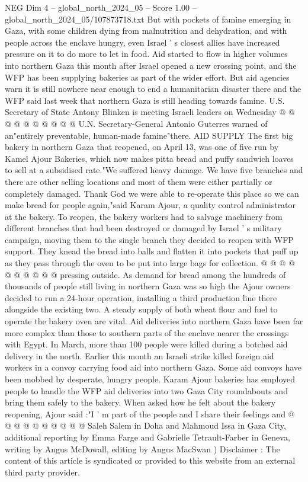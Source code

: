 \begin{textsample}{NEG Dim 4 – global\_north\_2024\_05 – Score 1.00 – global\_north\_2024\_05/107873718.txt}
But with pockets of famine emerging in Gaza, with some children dying from malnutrition and dehydration, and with people across the enclave hungry, even Israel ' s closest allies have increased pressure on it to do more to let in food.
Aid started to flow in higher volumes into northern Gaza this month after Israel opened a new crossing point, and the WFP has been supplying bakeries as part of the wider effort.
But aid agencies warn it is still nowhere near enough to end a humanitarian disaster there and the WFP said last week that northern Gaza is still heading towards famine.
U.S.
Secretary of State Antony Blinken is meeting Israeli leaders on Wednesday @ @ @ @ @ @ @ @ @ @ U.N.
Secretary-General Antonio Guterres warned of an"entirely preventable, human-made famine"there.
AID SUPPLY The first big bakery in northern Gaza that reopened, on April 13, was one of five run by Kamel Ajour Bakeries, which now makes pitta bread and puffy sandwich loaves to sell at a subsidised rate."We suffered heavy damage.
We have five branches and there are other selling locations and most of them were either partially or completely damaged.
Thank God we were able to re-operate this place so we can make bread for people again,"said Karam Ajour, a quality control administrator at the bakery.
To reopen, the bakery workers had to salvage machinery from different branches that had been destroyed or damaged by Israel ' s military campaign, moving them to the single branch they decided to reopen with WFP support.
They knead the bread into balls and flatten it into pockets that puff up as they pass through the oven to be put into large bags for collection. @ @ @ @ @ @ @ @ @ @ pressing outside.
As demand for bread among the hundreds of thousands of people still living in northern Gaza was so high the Ajour owners decided to run a 24-hour operation, installing a third production line there alongside the existing two.
A steady supply of both wheat flour and fuel to operate the bakery oven are vital.
Aid deliveries into northern Gaza have been far more complex than those to southern parts of the enclave nearer the crossings with Egypt.
In March, more than 100 people were killed during a botched aid delivery in the north.
Earlier this month an Israeli strike killed foreign aid workers in a convoy carrying food aid into northern Gaza.
Some aid convoys have been mobbed by desperate, hungry people.
Karam Ajour bakeries has employed people to handle the WFP aid deliveries into two Gaza City roundabouts and bring them safely to the bakery.
When asked how he felt about the bakery reopening, Ajour said :"I ' m part of the people and I share their feelings and @ @ @ @ @ @ @ @ @ @ Saleh Salem in Doha and Mahmoud Issa in Gaza City, additional reporting by Emma Farge and Gabrielle Tetrault-Farber in Geneva, writing by Angus McDowall, editing by Angus MacSwan ) Disclaimer : The content of this article is syndicated or provided to this website from an external third party provider.

\end{textsample}
